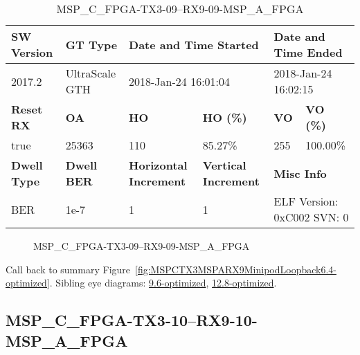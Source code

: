 \begin{table}[h]
\centering
\caption{MSP\_C\_FPGA-TX3-09--RX9-09-MSP\_A\_FPGA}
\label{tab:MSPCFPGATX309RX909MSPAFPGA6.4-optimized}
\begin{tabular}{@{}|l|l|l|l|l|l|@{}}
\toprule
\textbf{SW Version}                & \textbf{GT Type}   & \multicolumn{2}{l|}{\textbf{Date and Time Started}}            & \multicolumn{2}{l|}{\textbf{Date and Time Ended}}        \\ \midrule
2017.2                       & UltraScale GTH          & \multicolumn{2}{l|}{2018-Jan-24 16:01:04}                   & \multicolumn{2}{l|}{2018-Jan-24 16:02:15}               \\ \midrule
\textbf{Reset RX}                  & \textbf{OA} & \textbf{HO}   & \textbf{HO (\%)} & \textbf{VO} & \textbf{VO (\%)} \\ \midrule
true & 25363        & 110          & 85.27\%        & 255        & 100.00\%       \\ \midrule
\textbf{Dwell Type}                & \textbf{Dwell BER} & \textbf{Horizontal Increment} & \textbf{Vertical Increment}    & \multicolumn{2}{l|}{\textbf{Misc Info}}                  \\ \midrule
BER                            & 1e-7        & 1        & 1           & \multicolumn{2}{l|}{ELF Version: 0xC002 SVN: 0}                         \\ \bottomrule
\end{tabular}
\end{table}

\begin{figure}[h]
\caption{MSP\_C\_FPGA-TX3-09--RX9-09-MSP\_A\_FPGA} \label{fig:MSPCFPGATX309RX909MSPAFPGA6.4-optimized}
\end{figure}

Call back to summary Figure~\ref{fig:MSPCTX3MSPARX9MinipodLoopback6.4-optimized}.
Sibling eye diagrams: \hyperref[sec:MSPCFPGATX309RX909MSPAFPGA9.6-optimized]{9.6-optimized}, \hyperref[sec:MSPCFPGATX309RX909MSPAFPGA12.8-optimized]{12.8-optimized}.

\clearpage
\newpage


\subsection{MSP\_C\_FPGA-TX3-10--RX9-10-MSP\_A\_FPGA}\label{sec:MSPCFPGATX310RX910MSPAFPGA6.4-optimized}

